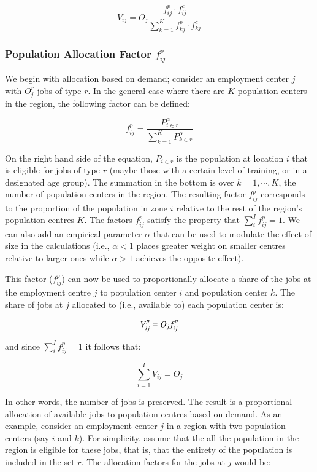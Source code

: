 \documentclass[]{elsarticle} %
\begin{document}
\[
V_{ij} = O_j\frac{f^p_{ij} \cdot f^c_{ij}}{\sum_{k=1}^K f^p_{kj} \cdot f^c_{kj}}
\]

\hypertarget{population-allocation-factor-fp_ij}{%
\subsubsection{\texorpdfstring{Population Allocation Factor
\(f^p_{ij}\)}{Population Allocation Factor f\^{}p\_\{ij\}}}\label{population-allocation-factor-fp_ij}}

We begin with allocation based on demand; consider an employment center
\(j\) with \(O_j^r\) jobs of type \(r\). In the general case where there
are \(K\) population centers in the region, the following factor can be
defined:

\[
f^p_{ij} = \frac{P_{i\in r}^\alpha}{\sum_{k=1}^K P_{k\in r}^\alpha}
\]

\noindent On the right hand side of the equation, \(P_{i\in r}\) is the
population at location \(i\) that is eligible for jobs of type \(r\)
(maybe those with a certain level of training, or in a designated age
group). The summation in the bottom is over \(k=1,\cdots,K\), the number
of population centers in the region. The resulting factor \(f^p_{ij}\)
corresponds to the proportion of the population in zone \(i\) relative
to the rest of the region's population centres \(K\). The factors
\(f^p_{ij}\) satisfy the property that \(\sum_i^{I} f^p_{ij} = 1\). We
can also add an empirical parameter \(\alpha\) that can be used to
modulate the effect of size in the calculations (i.e., \(\alpha <1\)
places greater weight on smaller centres relative to larger ones while
\(\alpha>1\) achieves the opposite effect).

This factor (\(f^p_{ij}\)) can now be used to proportionally allocate a
share of the jobs at the employment centre \(j\) to population center
\(i\) and population center \(k\). The share of jobs at \(j\) allocated
to (i.e., available to) each population center is:

\[
V^p_{ij} = O_jf^p_{ij}\\
\]

\noindent and since \(\sum_i^{I} f^p_{ij} = 1\) it follows that:

\[
\sum_{i=1}^I V_{ij} = O_j 
\]

In other words, the number of jobs is preserved. The result is a
proportional allocation of available jobs to population centres based on
demand. As an example, consider an employment center \(j\) in a region
with two population centers (say \(i\) and \(k\)). For simplicity,
assume that the all the population in the region is eligible for these
jobs, that is, that the entirety of the population is included in the
set \(r\). The allocation factors for the jobs at \(j\) would be:
\end{document}
